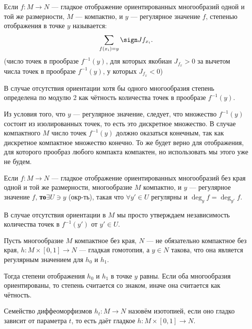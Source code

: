 \begin{to_def}
	Если $f \colon M \rightarrow N$ --- гладкое отображение ориентированных многообразий одной и той же размерности, $M$ --- компактно, и $y$ --- регулярное значение $f$, степенью отображения в точке $y$ называется:
	\begin{equation*}
		\sum_{f(x_i) = y} \sign J f_{x_i}.
	\end{equation*}
	(число точек в прообразе $f^{-1}(y)$, для которых якобиан $J_{f_x}>0$ за вычетом числа точек в прообразе $f^{-1}(y)$, у которых $J_{f_x}<0$)

	В случае отсутствия ориентации хотя бы одного многообразия степень определена по модулю 2 как чётность количества точек в прообразе $f^{-1}(y)$.
\end{to_def}

Из условия того, что $y$ --- регулярное значение, следует, что множество $f^{-1}(y)$ состоит из изолированных точек, то есть это дискретное множество. В случае компактного $M$ число точек $f^{-1}(y)$ должно оказаться конечным, так как дискретное компактное множество конечно. То же будет верно для отображения, для которого прообраз любого компакта компактен, но использовать мы этого уже не будем.

\begin{to_lem}
	Если $f\colon M \rightarrow N$ --- гладкое отображение ориентированных многообразий без края одной и той же размерности, многообразие $M$ компактно, и $y$ --- регулярное значение $f$, \textbf{то}$ \exists U \ni y$ (окр-ть), такая что $\forall y' \in U$ регулярны и $\deg_y f = \deg_{y'} f$. 

	В случае отсутствия ориентации в $M$ мы просто утверждаем независимость количества точек в $f^{-1} (y')$ от $y'\in U$.
\end{to_lem}

\begin{to_thr}
	Пусть многообразие $M$ компактное без края, $N$ --- не обязательно компактное без края, $h \colon M \times [0,1] \rightarrow N$ --- гладкая гомотопия, а $y \in N$ такова, что она является регулярным значением для $h_{0}$ и $h_{1}$. 

	Тогда степени отображения $h_0$ и $h_1$ в точке $y$ равны. Если оба многообразия ориентированы, то степень считается со знаком, иначе она считается как чётность.
\end{to_thr}

\begin{to_def}
	Семейство диффеоморфизмов $h_t \colon M \rightarrow N$ назовём изотопией, если оно гладко зависит от параметра $t$, то есть даёт гладкое $h \colon M \times [0,1] \rightarrow N$.
\end{to_def}

